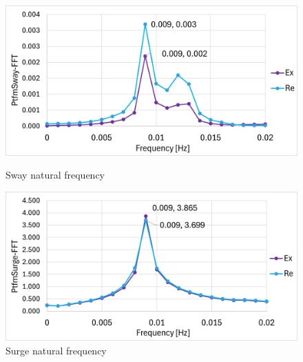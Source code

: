 \documentclass[a4paper, 11pt]{article}
\begin{document}
\begin{figure}[H]
    \begin{minipage}{0.47\textwidth}
        \centering
        \includegraphics[width=1\textwidth]{nat_freq_sway_1.png}
        \caption{\small Sway natural frequency}
        \label{fig:nat_freq_sway_recreated}
    \end{minipage}
    \hfill
    \begin{minipage}{0.48\textwidth}
        \centering
        \includegraphics[width=1\textwidth]{nat_freq_surge_1.png}
        \caption{\small Surge natural frequency}
        \label{fig:nat_freq_surge_recreated}
    \end{minipage}
\end{figure}
\end{document}
